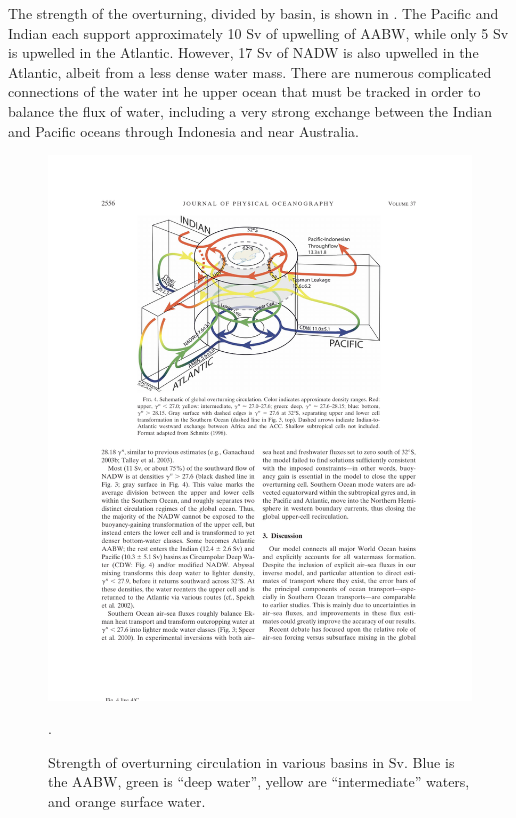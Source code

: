 The strength of the overturning, divided by basin, is shown in .  The Pacific and Indian each support approximately 10 Sv of upwelling of AABW, while only 5 Sv is upwelled in the Atlantic. However, 17 Sv of NADW is also upwelled in the Atlantic, albeit from a less dense water mass.   There are numerous complicated connections of the water int he upper ocean that must be tracked in order to balance the flux of water, including a very strong exchange between the Indian and Pacific oceans through Indonesia and near Australia.  

\begin{figure}[hbt]
  \begin{center}
  \includegraphics{figs/WaterMasses/LumpkinSpeer07Fig4}
    \caption{Strength of overturning circulation in various basins in $\mathrm{Sv}$.  Blue is the AABW, green is ``deep water'', yellow are ``intermediate'' waters, and orange surface water. \citep{lumpkinspeer07}}.  
    \label{fig:LumpkinSpeer07Fig4}  
  \end{center}
\end{figure}

